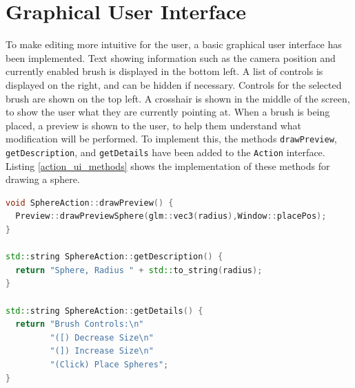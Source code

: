 \documentclass{article}
\begin{document}
\section{Graphical User Interface}
To make editing more intuitive for the user, a basic graphical user interface has been implemented. Text showing information such as the camera position and currently enabled brush is displayed in the bottom left. A list of controls is displayed on the right, and can be hidden if necessary. Controls for the selected brush are shown on the top left. A crosshair is shown in the middle of the screen, to show the user what they are currently pointing at. When a brush is being placed, a preview is shown to the user, to help them understand what modification will be performed. To implement this, the methods \texttt{drawPreview}, \texttt{getDescription}, and \texttt{getDetails} have been added to the \texttt{Action} interface. Listing \ref{action_ui_methods} shows the implementation of these methods for drawing a sphere.

\begin{lstlisting}[language=C++,label={action_ui_methods},caption={The UI methods for the \texttt{SphereAction} class. The function \texttt{Preview::drawPreviewSphere} draws a semi-transparent sphere in the scene, loaded from an external 3D model file, using standard OpenGL methods.}]
void SphereAction::drawPreview() {
  Preview::drawPreviewSphere(glm::vec3(radius),Window::placePos);
}

std::string SphereAction::getDescription() {
  return "Sphere, Radius " + std::to_string(radius);
}

std::string SphereAction::getDetails() {
  return "Brush Controls:\n"
         "([) Decrease Size\n"
         "(]) Increase Size\n"
         "(Click) Place Spheres";
}
\end{lstlisting}
\end{document}
